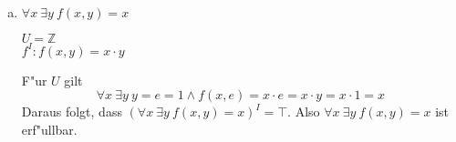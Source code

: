 \documentclass[10pt, oneside]{article}
\begin{document}
\begin{enumerate}[(a)]
    \item $\forall x \ \exists y\ f(x, y) = x$

        $U = \mathbb{Z}$ \\[5pt]
        $f^I : f(x, y) = x \cdot y$

        F"ur $U$ gilt
        \begin{equation*}
            \forall x \ \exists y\  y = e = 1 \land f(x, e) = x \cdot e = x \cdot y = x \cdot 1 = x
        \end{equation*}
        Daraus folgt, dass $(\forall x \ \exists y\ f(x, y) = x)^I = \top$.
        Also $\forall x \ \exists y\ f(x, y) = x$ ist erf"ullbar.

\end{enumerate}
\end{document}
